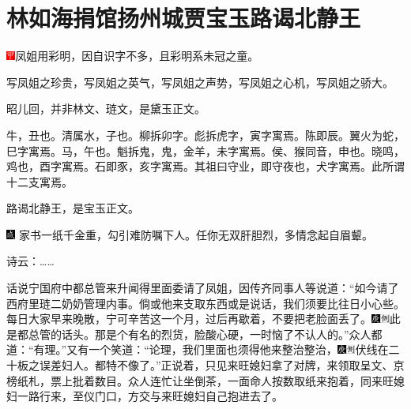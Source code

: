 

\chapter{林如海捐馆扬州城\hspace{.5em}贾宝玉路谒北静王}

{\includegraphics[width=3mm]{../Images/00002}凤姐用彩明，因自识字不多，且彩明系未冠之童。}

{写凤姐之珍贵，写凤姐之英气，写凤姐之声势，写凤姐之心机，写凤姐之骄大。}

{昭儿回，并非林文、琏文，是黛玉正文。}

{牛，丑也。清属水，子也。柳拆卯字。彪拆虎字，寅字寓焉。陈即辰。翼火为蛇，巳字寓焉。马，午也。魁拆鬼，鬼，金羊，未字寓焉。侯、猴同音，申也。晓鸣，鸡也，酉字寓焉。石即豕，亥字寓焉。其祖曰守业，即守夜也，犬字寓焉。此所谓十二支寓焉。}

{路谒北静王，是宝玉正文。}

{\includegraphics[width=3mm]{../Images/00005}  \kaishu 家书一纸千金重，勾引难防嘱下人。任你无双肝胆烈，多情念起自眉颦。}

诗云：\ldots{}\ldots{}

话说宁国府中都总管来升闻得里面委请了凤姐，因传齐同事人等说道：“如今请了西府里琏二奶奶管理内事。倘或他来支取东西或是说话，我们须要比往日小心些。每日大家早来晚散，宁可辛苦这一个月，过后再歇着，不要把老脸面丢了。{\includegraphics[width=3mm]{../Images/00004}\includegraphics[width=3mm]{../Images/00011}\footnotesize \kaishu 此是都总管的话头。}那是个有名的烈货，脸酸心硬，一时恼了不认人的。”众人都道：“有理。”又有一个笑道：“论理，我们里面也须得他来整治整治，{\includegraphics[width=3mm]{../Images/00004}\includegraphics[width=3mm]{../Images/00011}\footnotesize \kaishu 伏线在二十板之误差妇人。}都特不像了。”正说着，只见来旺媳妇拿了对牌，来领取呈文、京榜纸札，票上批着数目。众人连忙让坐倒茶，一面命人按数取纸来抱着，同来旺媳妇一路行来，至仪门口，方交与来旺媳妇自己抱进去了。

